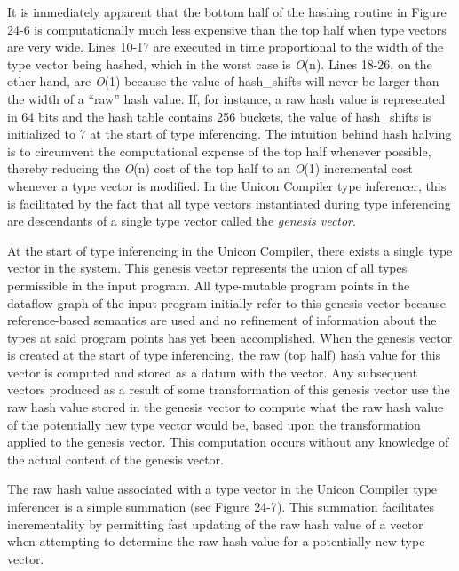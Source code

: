 It is immediately apparent that the bottom half of the hashing routine
in Figure 24-6 is computationally much less expensive than the top half
when type vectors are very wide. Lines 10-17 are executed in time
proportional to the width of the type vector being hashed, which in
the worst case is {\textit{O}}(n). Lines 18-26, on the other hand, are
{\textit{O}}(1) because the value of {\textsf{hash\_shifts}} will
never be larger than the width of a ``raw'' hash value. If, for
instance, a raw hash value is represented in 64 bits and the hash
table contains 256 buckets, the value of hash\_shifts is initialized
to 7 at the start of type inferencing. The intuition behind hash
halving is to circumvent the computational expense of the top half
whenever possible, thereby reducing the {\textit{O}}(n) cost of the
top half to an {\textit{O}}(1) incremental cost whenever a type vector
is modified. In the Unicon Compiler type inferencer, this is
facilitated by the fact that all type vectors instantiated during type
inferencing are descendants of a single type vector called the
{\textit{genesis vector}}.

At the start of type inferencing in the Unicon Compiler, there exists
a single type vector in the system. This genesis vector represents the
union of all types permissible in the input program. All type-mutable
program points in the dataflow graph of the input program initially
refer to this genesis vector because reference-based semantics are
used and no refinement of information about the types at said program
points has yet been accomplished. When the genesis vector is created
at the start of type inferencing, the raw (top half) hash value for
this vector is computed and stored as a datum with the vector. Any
subsequent vectors produced as a result of some transformation of this
genesis vector use the raw hash value stored in the genesis vector to
compute what the raw hash value of the potentially new type vector
would be, based upon the transformation applied to the genesis
vector. This computation occurs without any knowledge of the actual
content of the genesis vector.

The raw hash value associated with a type vector in the Unicon
Compiler type inferencer is a simple summation (see Figure 24-7). This
summation facilitates incrementality by permitting fast updating of
the raw hash value of a vector when attempting to determine the raw
hash value for a potentially new type vector.

